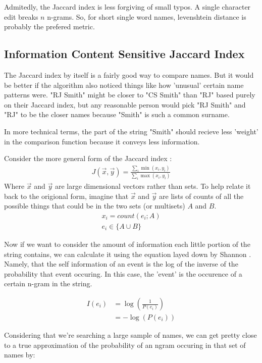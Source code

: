 \documentclass[11pt]{article}
\begin{document}
Admitedly, the Jaccard index is less forgiving of small typos. 
A single character edit breaks $n$ n-grams. So, for short single
word names, levenshtein distance is probably the prefered metric.

\subsection{Information Content Sensitive Jaccard Index}
The Jaccard index by itself is a fairly good way to compare names.
But it would be better if the algorithm also noticed things like
how 'unusual' certain name patterns were. 
"RJ Smith" might be closer to "CS Smith" than "RJ" based purely
on their Jaccard index, but any reasonable person would pick
"RJ Smith" and "RJ" to be the closer names because "Smith" is
such a common surname.

In more technical terms, the part of the string "Smith"
should recieve less 'weight' in the comparison function because
it conveys less information. 

Consider the more general form of the Jaccard index \cite{general}:
\begin{align*}
J(\vec{x},\vec{y}) = 
\frac{\sum_i \min(x_i, y_i)}{\sum_i \max(x_i, y_i)}
\end{align*}
Where $\vec{x}$ and $\vec{y}$ are large dimensional vectors rather 
than sets. To help relate it back to the origional form, 
imagine that $\vec{x}$ and $\vec{y}$ are lists
of counts of all the possible things that could be in the two sets
(or multisets) $A$ and $B$.
\begin{align*}
x_i = count(e_i; A)\\
e_i \in \{A \cup B \}
\end{align*}

Now if we want to consider the amount of information each little
portion of the string contains, we can calculate it
using the equation layed down by Shannon \cite{shannon}.
Namely, that the self information of an event is the log of the
inverse of the probability that event occuring. In this case,
the 'event' is the occurence of a certain n-gram in the string.

\begin{align*}
I(e_i) &= \log\left(\frac{1}{P(e_i)}\right)\\
&= -\log(P(e_i))
\end{align*}

Considering that we're searching a large sample of names, we
can get pretty close to a true approximation of the probability
of an ngram occuring in that set of names by:
\end{document}
